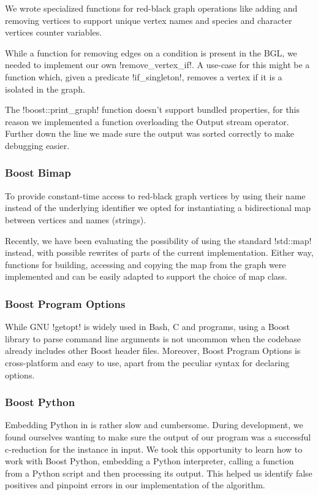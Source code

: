 We wrote specialized functions for red-black graph operations like adding and removing vertices to support unique vertex names and species and character vertices counter variables.

While a function for removing edges on a condition is present in the BGL, we needed to implement our own !remove_vertex_if!.
A  use-case for this might be a function which, given a predicate !if_singleton!, removes a vertex if it is a isolated in the graph.

The !boost::print_graph! function doesn't support bundled properties, for this reason we implemented a function overloading the Output stream operator.
Further down the line we made sure the output was sorted correctly to make debugging easier.

\subsubsection*{Boost Bimap}

To provide constant-time access to red-black graph vertices by using their name instead of the underlying identifier we opted for instantiating a bidirectional map between vertices and names (strings).

Recently, we have been evaluating the possibility of using the standard !std::map! instead, with possible rewrites of parts of the current implementation.
Either way, functions for building, accessing and copying the map from the graph were implemented and can be easily adapted to support the choice of map class.

\subsubsection*{Boost Program Options}

While GNU !getopt! is widely used in Bash, C and \cc{} programs, using a Boost library to parse command line arguments is not uncommon when the codebase already includes other Boost header files.
Moreover, Boost Program Options is cross-platform and easy to use, apart from the peculiar syntax for declaring options.

\subsubsection*{Boost Python}

Embedding Python in \cc{} is rather slow and cumbersome.
During development, we found ourselves wanting to make sure the output of our program was a successful c-reduction for the instance in input.
We took this opportunity to learn how to work with Boost Python, embedding a Python interpreter, calling a function from a Python script and then processing its output.
This helped us identify false positives and pinpoint errors in our implementation of the algorithm.


